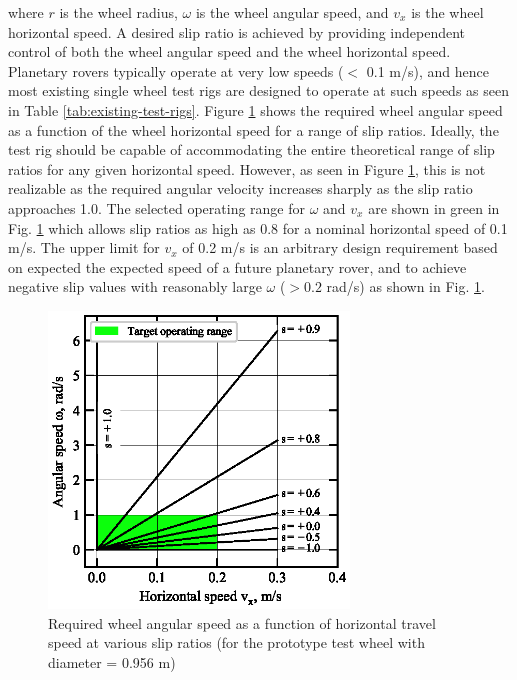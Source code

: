 \documentclass{article}
\begin{document}
where $r$ is the wheel radius, $\omega$ is the wheel angular speed, and $v_x$ is the wheel horizontal speed. A desired slip ratio is achieved by providing independent control of both the wheel angular speed and the wheel horizontal speed. Planetary rovers typically operate at very low speeds ($<$ 0.1 m/s), and hence most existing single wheel test rigs are designed to operate at such speeds as seen in Table \ref{tab:existing-test-rigs}. Figure \ref{fig:slip-ratio-chart} shows the required wheel angular speed as a function of the wheel horizontal speed for a range of slip ratios. Ideally, the test rig should be capable of accommodating the entire theoretical range of slip ratios for any given horizontal speed. However, as seen in Figure \ref{fig:slip-ratio-chart}, this is not realizable as the required angular velocity increases sharply as the slip ratio approaches 1.0. The selected operating range for $\omega$ and $v_x$ are shown in green in Fig. \ref{fig:slip-ratio-chart} which allows slip ratios as high as 0.8 for a nominal horizontal speed of 0.1 m/s. The upper limit for $v_x$ of 0.2 m/s is an arbitrary design requirement based on expected the expected speed of a future planetary rover, and to achieve negative slip values with reasonably large $\omega$ ($> 0.2$ rad/s) as shown in Fig. \ref{fig:slip-ratio-chart}. 


\begin{figure}[hbt!]
\centering
\includegraphics[width=3.15in]{plots/slip-ratios.eps}
\caption{Required wheel angular speed as a function of horizontal travel speed at various slip ratios (for the prototype test wheel with diameter = 0.956 m)}
\label{fig:slip-ratio-chart}
\end{figure}
\end{document}
